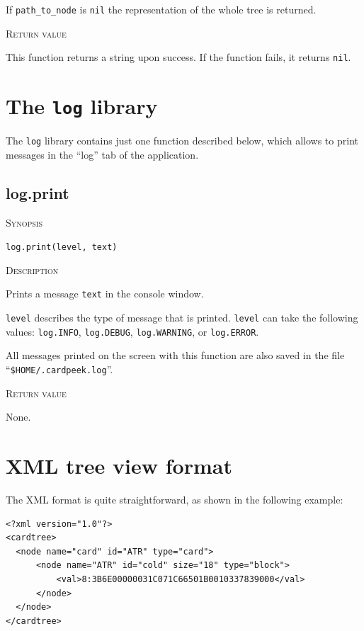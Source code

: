 \documentclass[11pt]{report}
\newcommand{\mansection}[1]{\vspace{0.5em}\par\noindent\textsc{#1}\vspace{0.5em}\par}
\newcommand{\syn}[1]{\texttt{#1}}
\begin{document}
  If \syn{path\_to\_node} is \syn{nil} the representation of the whole 
  tree is returned.
  
\mansection{Return value}
  This function returns a string upon success.
  If the function fails, it returns \syn{nil}.


\section{The \syn{log} library}

The \syn{log} library contains just one function described below, which allows to print messages in the ``log'' tab of the application.

\subsection{log.print}

\mansection{Synopsis}
\syn{log.print(level, text)}

\mansection{Description}
  Prints a message \syn{text} in the console window.

  \syn{level} describes the type of message that is printed. 
  \syn{level} can take the following values: \syn{log.INFO}, 
  \syn{log.DEBUG}, \syn{log.WARNING}, or \syn{log.ERROR}.

  All messages printed on the screen with this function are also 
  saved in the file ``\syn{\$HOME/.cardpeek.log}''.
\mansection{Return value}
  None.


\section{XML tree view format}
\label{section:xmlformat}

The XML format is quite straightforward, as shown in the following example:
\begin{verbatim}
<?xml version="1.0"?>
<cardtree>
  <node name="card" id="ATR" type="card">
      <node name="ATR" id="cold" size="18" type="block">
          <val>8:3B6E00000031C071C66501B0010337839000</val>
      </node>
  </node>
</cardtree>
\end{verbatim}
\end{document}
